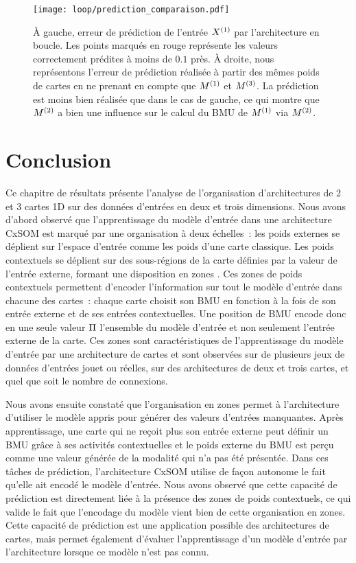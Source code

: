 \documentclass[../main]{subfiles}
\begin{document}
\begin{figure}[h!]
	\centering\texttt{[image: loop/prediction\_comparaison.pdf]}
	\caption{\`A gauche, erreur de prédiction de l'entrée $X^{({1})}$ par l'architecture en boucle. Les points marqués en rouge représente les valeurs correctement prédites à moins de $0.1$ près. 
	\`A droite, nous représentons l'erreur de prédiction réalisée à partir des mêmes poids de cartes en ne prenant en compte que $M^{({1})}$ et $M^{({3})}$. La prédiction est moins bien réalisée que dans le cas de gauche, ce qui montre que $M^{({2})}$ a bien une influence sur le calcul du BMU de $M^{({1})}$ via $M^{({2})}$.
	\label{fig:pred_loop}}
\end{figure}

\section{Conclusion}

Ce chapitre de résultats présente l'analyse de l'organisation d'architectures de 2 et 3 cartes 1D sur des données d'entrées en deux et trois dimensions.
Nous avons d'abord observé que l'apprentissage du modèle d'entrée dans une architecture CxSOM est marqué par une organisation à deux échelles~: les poids externes se déplient sur l'espace d'entrée comme les poids d'une carte classique. Les poids contextuels se déplient sur des sous-régions de la carte définies par la valeur de l'entrée externe, formant une disposition en \og zones \fg{}.
Ces zones de poids contextuels permettent d'encoder l'information sur tout le modèle d'entrée dans chacune des cartes~: 
chaque carte choisit son BMU en fonction à la fois de son entrée externe et de ses entrées contextuelles. Une position de BMU encode donc en une seule valeur $\Pi$ l'ensemble du modèle d'entrée et non seulement l'entrée externe de la carte.
Ces zones sont caractéristiques de l'apprentissage du modèle d'entrée par une architecture de cartes et sont observées sur de plusieurs jeux de données d'entrées jouet ou réelles, sur des architectures de deux et trois cartes, et quel que soit le nombre de connexions.

Nous avons ensuite constaté que l'organisation en zones permet à l'architecture d'utiliser le modèle appris pour générer des valeurs d'entrées manquantes.
Après apprentissage, une carte qui ne reçoit plus son entrée externe peut définir un BMU grâce à ses activités contextuelles et le poids externe du BMU est perçu comme une valeur générée de la modalité qui n'a pas été présentée.
Dans ces tâches de prédiction, l'architecture CxSOM utilise de façon autonome le fait qu'elle ait encodé le modèle d'entrée. 
Nous avons observé que cette capacité de prédiction est directement liée à la présence des zones de poids contextuels, ce qui valide le fait que l'encodage du modèle vient bien de cette organisation en zones.
Cette capacité de prédiction est une application possible des architectures de cartes, mais permet également d'évaluer l'apprentissage d'un modèle d'entrée par l'architecture lorsque ce modèle n'est pas connu.
\end{document}
